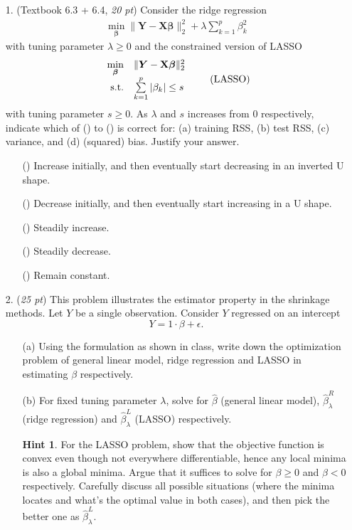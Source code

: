 \documentclass[10pt]{article}
\theoremstyle{definition}
\newtheorem*{hint}{Hint}
\theoremstyle{remark}
\newcommand{\Xb}{\mathbf{X}}
\newcommand{\bY}{\bm{Y}}
\newcommand{\bbeta}{\bm{\beta}}
\begin{document}
\begin{itemize}
	\item [1.] (Textbook 6.3 + 6.4, \textit{20 pt})	Consider the ridge regression 
	\begin{align*}
	\min_{\bbeta}  \|\bY - \Xb\bbeta\|_{2}^{2} + \lambda \sum_{k=1}^{p}\beta_{k}^{2} \tag{ridge regression}
	\end{align*}
	with tuning parameter $ \lambda \ge 0 $ and the constrained version of LASSO
	\begin{align*}
	\begin{array}{rl}
	\min\limits_{\bbeta} & \|\bY - \Xb\bbeta\|_{2}^{2}\\
	\rm{s.t.} & \sum\limits_{k=1}^{p}|\beta_{k}| \le s
	\end{array}
	\tag{LASSO}
	\end{align*}
	with tuning parameter $ s \ge 0 $. As $ \lambda $ and $ s $ increases from $ 0 $ respectively, indicate which of () to () is correct for: (a) training RSS, (b) test RSS, (c) variance, and (d) (squared) bias. Justify your answer.
	\begin{itemize}
		\item [(\romannum{1})] Increase initially, and then eventually start decreasing in an inverted U shape.
		
		\item [(\romannum{2})] Decrease initially, and then eventually start increasing in a U shape.
		
		\item [(\romannum{3})] Steadily increase.
		
		\item [(\romannum{4})] Steadily decrease.
		
		\item [(\romannum{5})] Remain constant.
	\end{itemize}

	\item [2.] (\textit{25 pt}) This problem illustrates the estimator property in the shrinkage methods. Let $ Y $ be a single observation. Consider $ Y $ regressed on an intercept
	\[ Y = 1 \cdot \beta + \epsilon. \]
	\begin{itemize}
		\item [(a)] Using the formulation as shown in class, write down the optimization problem of general linear model, ridge regression and LASSO in estimating $ \beta $ respectively.
		
		\item [(b)] For fixed tuning parameter $ \lambda $, solve for $ \hat{\beta} $ (general linear model), $ \hat{\beta}_{\lambda}^{R} $ (ridge regression) and $ \hat{\beta}_{\lambda}^{L} $ (LASSO) respectively.
		\begin{hint}
			For the LASSO problem, show that the objective function is convex even though not everywhere differentiable, hence any local minima is also a global minima. Argue that it suffices to solve for $ \beta \ge 0 $ and $ \beta < 0 $ respectively. Carefully discuss all possible situations (where the minima locates and what's the optimal value in both cases), and then pick the better one as $ \hat{\beta}_{\lambda}^{L} $.
		\end{hint}
	

\end{itemize}
\end{itemize}
\end{document}
